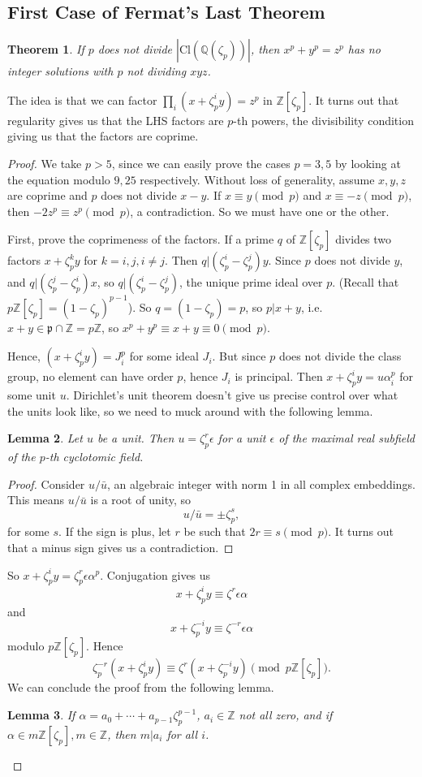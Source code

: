 \documentclass[letterpaper, 12pt]{article}
\newtheorem{thm}{Theorem}[subsection]
\newtheorem{lem}[thm]{Lemma}
\newcommand{\cl}[1]{{\mathrm{Cl}(#1)}}
\newcommand{\rats}{\mathbb{Q}}
\renewcommand{\prime}{\mathfrak{p}}
\begin{document}
\subsection{First Case of Fermat's Last Theorem}
\begin{thm}
If $p$ does not divide $|\cl {\rats(\zeta_p)}|$, then $x^p + y^p = z^p$ has no integer solutions with $p$ not dividing $xyz$.
\end{thm}

The idea is that we can factor $\prod_i (x + \zeta_p^i y) = z^p$ in $\mathbb{Z}[\zeta_p]$. It turns out that regularity gives us that the LHS factors are $p$-th powers, the divisibility condition giving us that the factors are coprime. 

\begin{proof}
  We take $p > 5$, since we can easily prove the cases $p = 3, 5$ by looking at the equation modulo $9, 25$ respectively. Without loss of generality, assume $x, y, z$ are coprime and $p$ does not divide $x - y$. If $x \equiv y \pmod p$ and $x \equiv -z \pmod p$, then $-2z^p \equiv z^p \pmod p$, a contradiction. So we must have one or the other.

  First, prove the coprimeness of the factors. If a prime $q$ of $\mathbb{Z}[\zeta_p]$ divides two factors $x + \zeta_p^k y$ for $k = i, j, i \neq j$. Then $q | (\zeta_p^i - \zeta_p^j) y$. Since $p$ does not divide $y$, and $q | (\zeta_p^j - \zeta_p^i) x$, so $q | (\zeta_p^i - \zeta_p^j)$, the unique prime ideal over $p$. (Recall that $p \mathbb{Z}[\zeta_p] = (1 - \zeta_p)^{p - 1}$). So $q = (1 - \zeta_p) = p$, so $p | x + y$, i.e. $x + y \in \prime \cap \mathbb{Z} = p\mathbb{Z}$, so $x^p + y^p \equiv x + y \equiv 0 \pmod p$. 

  Hence, $(x + \zeta_p^i y) = J_i^p$ for some ideal $J_i$. But since $p$ does not divide the class group, no element can have order $p$, hence $J_i$ is principal. Then $x + \zeta_p^i y = u \alpha_i^p$ for some unit $u$. Dirichlet's unit theorem doesn't give us precise control over what the units look like, so we need to muck around with the following lemma.

\begin{lem}
Let $u$ be a unit. Then $u = \zeta_p^r \epsilon$ for a unit $\epsilon$ of the maximal real subfield of the $p$-th cyclotomic field.
\end{lem}
\begin{proof}
  Consider $u / \bar{u}$, an algebraic integer with norm 1 in all complex embeddings. This means $u/\bar{u}$ is a root of unity, so \[u/\bar{u} = \pm \zeta_p^s,\] for some $s$. If the sign is plus, let $r$ be such that $2r \equiv s \pmod p$. It turns out that a minus sign gives us a contradiction.
\end{proof}
  So $x + \zeta_p^i y = \zeta_p^r \epsilon \alpha^p$. Conjugation gives us \[x + \zeta_p^i y \equiv \zeta^r \epsilon \alpha \] and \[ x + \zeta_p^{-i} y \equiv \zeta^{-r} \epsilon \alpha \] modulo $p \mathbb{Z}[\zeta_p]$. Hence \[ \zeta_p^{-r} ( x + \zeta_p^i y) \equiv \zeta^r ( x + \zeta_p^{-i} y) \pmod{p\mathbb{Z}[\zeta_p]}. \] We can conclude the proof from the following lemma.

\begin{lem}
If $\alpha = a_0 + \cdots + a_{p - 1} \zeta_p^{p - 1}$, $a_i \in \mathbb{Z}$ not all zero, and if $\alpha \in m \mathbb{Z}[\zeta_p], m \in \mathbb{Z}$, then $m | a_i$ for all $i$.
\end{lem}
\end{proof}
\end{document}
